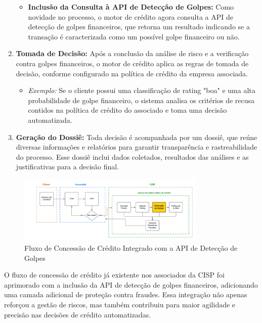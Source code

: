 \documentclass[12pt,a4paper]{article}
\begin{document}
\begin{enumerate}
\begin{itemize}
        \item \textbf{Inclusão da Consulta à API de Detecção de Golpes:} 
        Como novidade no processo, o motor de crédito agora consulta a API de detecção de golpes financeiros, que retorna um resultado indicando se a transação é caracterizada como um possível golpe financeiro ou não.
    \end{itemize}

    \item \textbf{Tomada de Decisão:} 
    Após a conclusão da análise de risco e a verificação contra golpes financeiros, o motor de crédito aplica as regras de tomada de decisão, conforme configurado na política de crédito da empresa associada.
    \begin{itemize}
        \item \textit{Exemplo:} Se o cliente possui uma classificação de rating "boa" e uma alta probabilidade de golpe financeiro, o sistema analisa os critérios de recusa contidos na política de crédito do associado e toma uma decisão automatizada.
    \end{itemize}

    \item \textbf{Geração do Dossiê:} 
    Toda decisão é acompanhada por um dossiê, que reúne diversas informações e relatórios para garantir transparência e rastreabilidade do processo. Esse dossiê inclui dados coletados, resultados das análises e as justificativas para a decisão final.
\end{enumerate}

\begin{figure}
    \centering
    \includegraphics[width=0.8\textwidth]{motordecredito.png}
    \caption{Fluxo de Concessão de Crédito Integrado com a API de Detecção de Golpes}
    \label{fig:fluxo_credito}
\end{figure}

O fluxo de concessão de crédito já existente nos associados da CISP foi aprimorado com a inclusão da API de detecção de golpes financeiros, adicionando uma camada adicional de proteção contra fraudes. Essa integração não apenas reforçou a gestão de riscos, mas também contribuiu para maior agilidade e precisão nas decisões de crédito automatizadas.

\newpage

\end{document}
